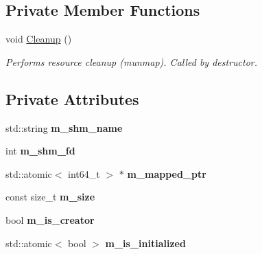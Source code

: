 \subsection*{Private Member Functions}
\begin{DoxyCompactItemize}
\item 
\mbox{\label{classEventDetect_1_1SharedMemoryTimestampExporter_a5710546acb54eeb6814e9c4e0a03de52}} 
void \mbox{\hyperlink{classEventDetect_1_1SharedMemoryTimestampExporter_a5710546acb54eeb6814e9c4e0a03de52}{Cleanup}} ()
\begin{DoxyCompactList}\small\item\em Performs resource cleanup (munmap). Called by destructor. \end{DoxyCompactList}\end{DoxyCompactItemize}
\subsection*{Private Attributes}
\begin{DoxyCompactItemize}
\item 
\mbox{\label{classEventDetect_1_1SharedMemoryTimestampExporter_a0ad48e2017a4d1092d798d51292a4c19}} 
std\+::string {\bfseries m\+\_\+shm\+\_\+name}
\item 
\mbox{\label{classEventDetect_1_1SharedMemoryTimestampExporter_a78c29a6554cbf4aadba4f356351874f0}} 
int {\bfseries m\+\_\+shm\+\_\+fd}
\item 
\mbox{\label{classEventDetect_1_1SharedMemoryTimestampExporter_a22ce3bdb2600e4d2eaae196fdec16a63}} 
std\+::atomic$<$ int64\+\_\+t $>$ $\ast$ {\bfseries m\+\_\+mapped\+\_\+ptr}
\item 
\mbox{\label{classEventDetect_1_1SharedMemoryTimestampExporter_a05b8f56830e36ec0565a6bd604cba15a}} 
const size\+\_\+t {\bfseries m\+\_\+size}
\item 
\mbox{\label{classEventDetect_1_1SharedMemoryTimestampExporter_a5a741cfc2329506bd860836aedd670e4}} 
bool {\bfseries m\+\_\+is\+\_\+creator}
\item 
\mbox{\label{classEventDetect_1_1SharedMemoryTimestampExporter_a17214ef7c5a2e0c2b1b4b86529b471f9}} 
std\+::atomic$<$ bool $>$ {\bfseries m\+\_\+is\+\_\+initialized}
\end{DoxyCompactItemize}


